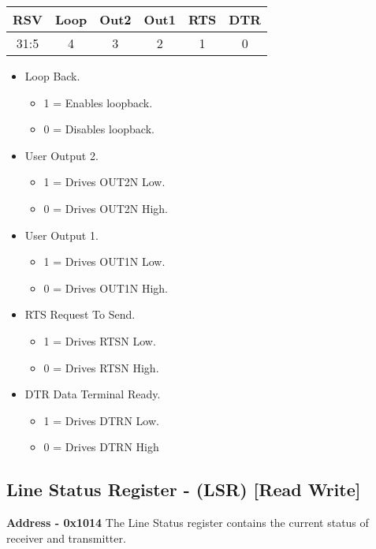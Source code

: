 \documentclass[12pt,a4paper]{report}
\begin{document}
\begin{center}
\begin{tabular}{|c|c|c|c|c|c| } 
 \hline
 RSV    & Loop & Out2  & Out1 & RTS & DTR\\ 
\hline
31:5 & 4 & 3 & 2  &  1 &  0\\
 \hline
\end{tabular}
\end{center}

\begin{itemize}
\item Loop Back.
\begin{itemize}
\item 1 = Enables loopback.
\item 0 = Disables loopback.
\end{itemize}
\item  User Output 2.
\begin{itemize}
\item 1 = Drives OUT2N Low.
\item 0 = Drives OUT2N High.
\end{itemize}

\item  User Output 1.
\begin{itemize}
\item 1 = Drives OUT1N Low.
\item 0 = Drives OUT1N High.

\end{itemize}
\item  RTS Request To Send.
\begin{itemize}
\item 1 = Drives RTSN Low.
\item 0 = Drives RTSN High.
\end{itemize}
\item  DTR Data Terminal Ready.
\begin{itemize}
\item 1 = Drives DTRN Low.
\item 0 = Drives DTRN High


\end{itemize}
\end{itemize}

\subsection{Line Status Register - (LSR)  [Read Write] }
\hspace{1.6cm}
\textbf{Address - 0x1014}
 The Line Status register contains the
current status of receiver and transmitter.
\end{document}
